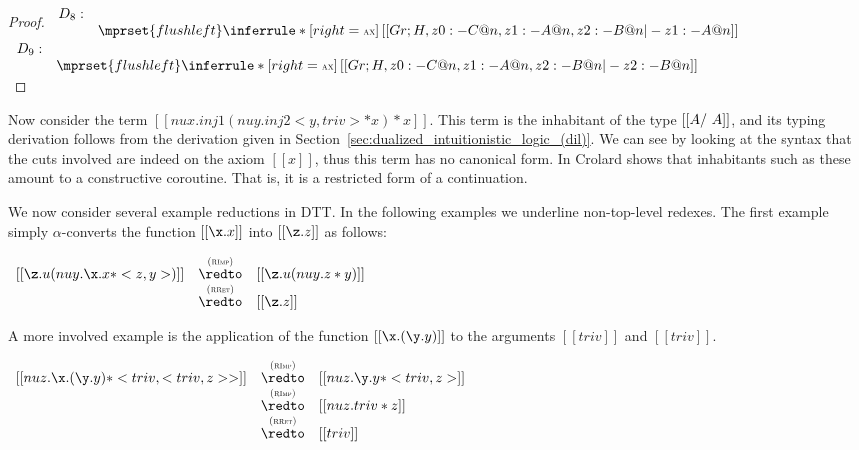 \begin{proof}
  \begin{math}
    \begin{array}{lcl}
      D_8:\\
      &
      $$\mprset{flushleft}
      \inferrule* [right=\scriptsize \ifrName{ax}] {
        \,
      }{[[Gr;H, z0 :- C @ n, z1 : - A @ n, z2 : - B @ n |- z1 : - A @n ]]}
    \end{array}
  \end{math} \\

  \begin{math}
    \begin{array}{lcl}
      D_9:\\
      &
      $$\mprset{flushleft}
      \inferrule* [right=\scriptsize \ifrName{ax}] {
        \,
      }{[[Gr;H, z0 :- C @ n, z1 : - A @ n, z2 : - B @ n |- z2 : - B @n ]]}
    \end{array}
  \end{math} \\
\end{proof}

Now consider the term $[[nu x . inj 1 (nu y. inj 2 <y,triv> * x) *
x]]$.  This term is the inhabitant of the type $[[A /\- ~A]]$, and its
typing derivation follows from the derivation given in
Section~\ref{sec:dualized_intuitionistic_logic_(dil)}.  We can see by
looking at the syntax that the cuts involved are indeed on the axiom
$[[x]]$, thus this term has no canonical form.  In \cite{Crolard:2004}
Crolard shows that inhabitants such as these amount to a constructive
coroutine.  That is, it is a restricted form of a continuation.

We now consider several example reductions in DTT. In the following
examples we underline non-top-level redexes. The first example simply
$\alpha$-converts the function $[[\x.x]]$ into $[[\z.z]]$ as follows:
\begin{center}
  \begin{math}
    \begin{array}{lcl}    
      [[\z.u(nu y.\x.x * <z , y>)]] & \redtoby{RImp}   & [[\z.u(nu y.z *  y)]]\\
                                    & \redtoby{RRet}   & [[\z.z]]\\
    \end{array}
\end{math}
\end{center}
A more involved example is the application of the function
$[[\x.(\y.y)]]$ to the arguments $[[triv]]$ and $[[triv]]$. 
\begin{center}
  \begin{math}
    \begin{array}{lcl}
      [[nu z.\x.(\y.y) * <triv,<triv,z>>]] & \redtoby{RImp} & [[nu z.\y.y * <triv ,z>]]\\
      & \redtoby{RImp} & [[nu z.triv * z]]\\
      & \redtoby{RRet} & [[triv]]\\
    \end{array}
  \end{math}
\end{center}

